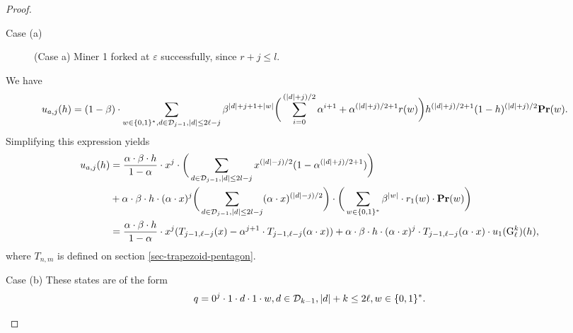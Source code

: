 \begin{proof}
\begin{subsubsection}{Case (a)}
\begin{figure}[ht!]
\caption{(Case a) Miner 1 forked at $\varepsilon$ successfully, since $r+j \leq l$.}
\end{figure}


We have
\begin{align*}
u_{a,j}(h) &= (1-\beta) \cdot \sum_{w\in \{0,1\}^\ast, d\in \mathcal{D}_{j-1}, |d| \leq 2\ell-j}\beta^{|d|+j+1+|w|} \bigg(\sum_{i=0}^{(|d|+j)/2}\alpha^{i+1} + \alpha^{(|d|+j)/2 + 1} r(w)\bigg) h^{(|d|+j)/2 + 1}(1-h)^{(|d|+j)/2} \mathbf{Pr}(w).
\end{align*}
Simplifying this expression yields
\begin{align*}
u_{a,j}(h) &= \frac{\alpha\cdot\beta\cdot h}{1-\alpha}\cdot x^j \cdot \bigg(\sum_{d\in \mathcal{D}_{j-1}, |d|\leq 2l - j}x^{(|d|-j)/2}(1-\alpha^{(|d|+j)/2 + 1})\bigg) \\
& +
\alpha\cdot\beta\cdot h \cdot(\alpha\cdot x)^j \bigg(\sum_{d\in \mathcal{D}_{j-1}, |d|\leq 2l - j} (\alpha\cdot x)^{(|d|-j)/2}\bigg)\cdot\bigg(\sum_{w\in\{0,1\}^\ast} \beta^{|w|}\cdot r_1(w)\cdot \mathbf{Pr}(w)\bigg)\\
    &= \frac{\alpha\cdot\beta\cdot h}{1-\alpha}\cdot x^j(T_{j-1,\ell-j}(x)-\alpha^{j+1}\cdot T_{j-1,\ell-j}(\alpha\cdot x)) + \alpha\cdot\beta\cdot h\cdot(\alpha \cdot x)^j\cdot T_{j-1,\ell-j}(\alpha\cdot x)\cdot u_1({\rm {G}}^k_\ell)(h),
\end{align*}
where $T_{n,m}$ is defined on section \ref{sec-trapezoid-pentagon}.

\end{subsubsection}

\begin{subsubsection}{Case (b)}
These states are of the form 
$$q = 0^j\cdot 1\cdot d\cdot 1\cdot w, d\in \mathcal{D}_{k-1}, |d|+k \leq 2\ell, w\in \{0,1\}^\ast.$$ 

\begin{figure}[ht!]

\end{figure}
\end{subsubsection}
\end{proof}
